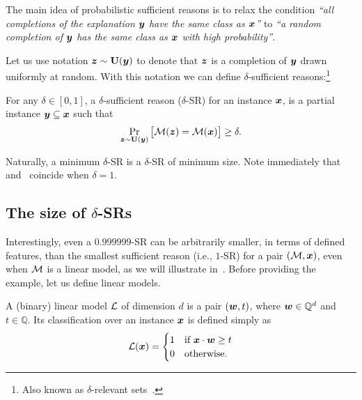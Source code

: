 The main idea of probabilistic sufficient reasons is to relax the condition \emph{``all completions of the explanation ${\bm{y}}$ have the same class as ${\bm{x}}$''} to \emph{``a random completion of ${\bm{y}}$ has the same class as ${\bm{x}}$ with high probability''}.

 Let us use notation ${\bm{z}} \sim \mathbf{U}({\bm{y}})$ to denote that ${\bm{z}}$ is a completion of ${\bm{y}}$ drawn uniformly at random.
With this notation we can define $\delta$-sufficient reasons:\footnote{Also known as $\delta$-relevant sets~\cite{Izza2021EfficientEW,Waldchen_MacDonald_Hauch_Kutyniok_2021}.}
\begin{definition}
	For any $\delta \in [0, 1]$, a $\delta$-sufficient reason ($\delta$-SR) for an instance ${\bm{x}}$, is a partial instance ${\bm{y}} \subseteq {\bm{x}}$ such that
	\[
		\Pr_{{\bm{z}} \sim  \mathbf{U}({\bm{y}})}\big[\mathcal{M}({\bm{z}}) = \mathcal{M}({\bm{x}})\big] \geq \delta.
	\]
	\label{def:delta-SR}
\end{definition}
%
Naturally, a minimum $\delta$-SR is a $\delta$-SR of minimum size. Note immediately that~ and~ coincide when $\delta = 1$.
\subsection{\texorpdfstring{The size of $\delta$-SRs}{The size of delta-SRs}}

Interestingly, even a $0.999999$-SR can be arbitrarily smaller, in terms of defined features, than the smallest sufficient reason (i.e., $1$-SR) for a pair $(\mathcal{M}, {\bm{x}})$, even when $\mathcal{M}$ is a linear model, as we will illustrate in~. Before providing the example, let us define linear models.

\begin{definition}
	A (binary) linear model $\mathcal{L}$ of dimension $d$ is a pair $({\bm{w}}, t)$, where ${\bm{w}} \in \mathbb{Q}^d$ and $t \in \mathbb{Q}$. Its classification over an instance ${\bm{x}}$ is defined simply as 
	\[
		\mathcal{L}({\bm{x}}) = \begin{cases}
			1 & \text{if } {\bm{x}} \cdot {\bm{w}} \geq t\\
			0 & \text{otherwise}.
		\end{cases}
	\]
	\label{def:linear-models}
\end{definition}

